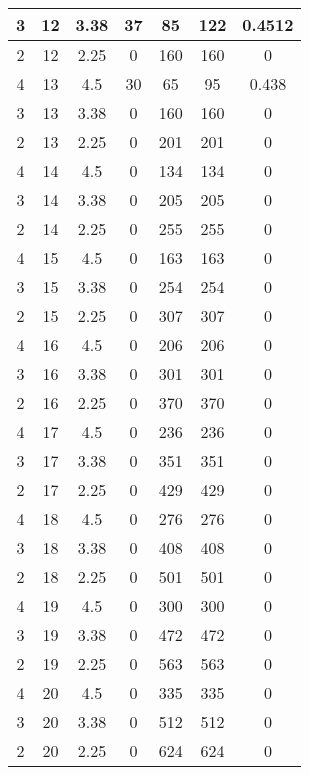 \documentclass[letterpaper, 12pt]{article}
\begin{document}
\begin{longtable}{|c|c|c|c|c|c|c|}
\hline
3 & 12 & 3.38 & 37 & 85 & 122 & 0.4512 \\
\hline
2 & 12 & 2.25 & 0 & 160 & 160 & 0 \\
\hline
4 & 13 & 4.5 & 30 & 65 & 95 & 0.438 \\
\hline
3 & 13 & 3.38 & 0 & 160 & 160 & 0 \\
\hline
2 & 13 & 2.25 & 0 & 201 & 201 & 0 \\
\hline
4 & 14 & 4.5 & 0 & 134 & 134 & 0 \\
\hline
3 & 14 & 3.38 & 0 & 205 & 205 & 0 \\
\hline
2 & 14 & 2.25 & 0 & 255 & 255 & 0 \\
\hline
4 & 15 & 4.5 & 0 & 163 & 163 & 0 \\
\hline
3 & 15 & 3.38 & 0 & 254 & 254 & 0 \\
\hline
2 & 15 & 2.25 & 0 & 307 & 307 & 0 \\
\hline
4 & 16 & 4.5 & 0 & 206 & 206 & 0 \\
\hline
3 & 16 & 3.38 & 0 & 301 & 301 & 0 \\
\hline
2 & 16 & 2.25 & 0 & 370 & 370 & 0 \\
\hline
4 & 17 & 4.5 & 0 & 236 & 236 & 0 \\
\hline
3 & 17 & 3.38 & 0 & 351 & 351 & 0 \\
\hline
2 & 17 & 2.25 & 0 & 429 & 429 & 0 \\
\hline
4 & 18 & 4.5 & 0 & 276 & 276 & 0 \\
\hline
3 & 18 & 3.38 & 0 & 408 & 408 & 0 \\
\hline
2 & 18 & 2.25 & 0 & 501 & 501 & 0 \\
\hline
4 & 19 & 4.5 & 0 & 300 & 300 & 0 \\
\hline
3 & 19 & 3.38 & 0 & 472 & 472 & 0 \\
\hline
2 & 19 & 2.25 & 0 & 563 & 563 & 0 \\
\hline
4 & 20 & 4.5 & 0 & 335 & 335 & 0 \\
\hline
3 & 20 & 3.38 & 0 & 512 & 512 & 0 \\
\hline
2 & 20 & 2.25 & 0 & 624 & 624 & 0 \\
\hline
\end{longtable}
\end{document}
